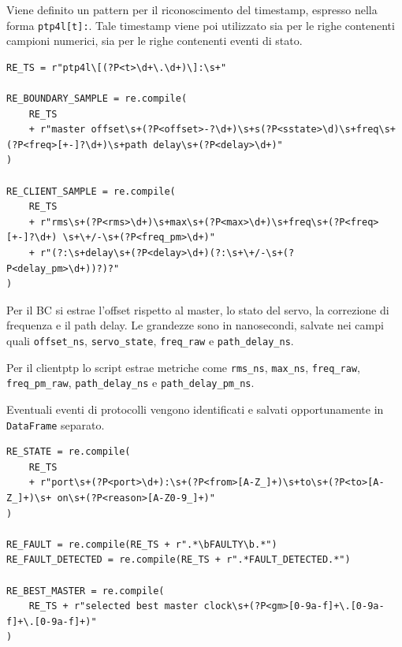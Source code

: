 Viene definito un pattern per il riconoscimento del timestamp, espresso nella forma
\texttt{ptp4l[t]:}. Tale timestamp viene poi utilizzato sia per le righe contenenti 
campioni numerici, sia per le righe contenenti eventi di stato.

\begin{listing}[H]
\begin{verbatim}
RE_TS = r"ptp4l\[(?P<t>\d+\.\d+)\]:\s+"

RE_BOUNDARY_SAMPLE = re.compile(
    RE_TS
    + r"master offset\s+(?P<offset>-?\d+)\s+s(?P<sstate>\d)\s+freq\s+(?P<freq>[+-]?\d+)\s+path delay\s+(?P<delay>\d+)"
)

RE_CLIENT_SAMPLE = re.compile(
    RE_TS
    + r"rms\s+(?P<rms>\d+)\s+max\s+(?P<max>\d+)\s+freq\s+(?P<freq>[+-]?\d+) \s+\+/-\s+(?P<freq_pm>\d+)"
    + r"(?:\s+delay\s+(?P<delay>\d+)(?:\s+\+/-\s+(?P<delay_pm>\d+))?)?"
)
\end{verbatim}
\caption{Pattern principali per l'estrazione dei campioni PTP.}
\label{lst:ptp-regex-samples}
\end{listing}

Per il BC si estrae l'offset rispetto al master, lo stato del servo, la correzione 
di frequenza e il path delay. Le grandezze sono in nanosecondi, salvate nei campi
quali \texttt{offset\_ns}, \texttt{servo\_state}, \texttt{freq\_raw} e
\texttt{path\_delay\_ns}.

Per il clientptp lo script estrae metriche come \texttt{rms\_ns}, \texttt{max\_ns}, \texttt{freq\_raw},
\texttt{freq\_pm\_raw}, \texttt{path\_delay\_ns} e \texttt{path\_delay\_pm\_ns}.

Eventuali eventi di protocolli vengono identificati e salvati opportunamente in \texttt{DataFrame}
separato.

\begin{listing}[H]
\begin{verbatim}
RE_STATE = re.compile(
    RE_TS
    + r"port\s+(?P<port>\d+):\s+(?P<from>[A-Z_]+)\s+to\s+(?P<to>[A-Z_]+)\s+ on\s+(?P<reason>[A-Z0-9_]+)"
)

RE_FAULT = re.compile(RE_TS + r".*\bFAULTY\b.*")
RE_FAULT_DETECTED = re.compile(RE_TS + r".*FAULT_DETECTED.*")

RE_BEST_MASTER = re.compile(
    RE_TS + r"selected best master clock\s+(?P<gm>[0-9a-f]+\.[0-9a-f]+\.[0-9a-f]+)"
)
\end{verbatim}
\caption{Pattern utilizzati per riconoscere eventi PTP nei log \texttt{ptp4l}.}
\label{lst:ptp-regex-events}
\end{listing}


